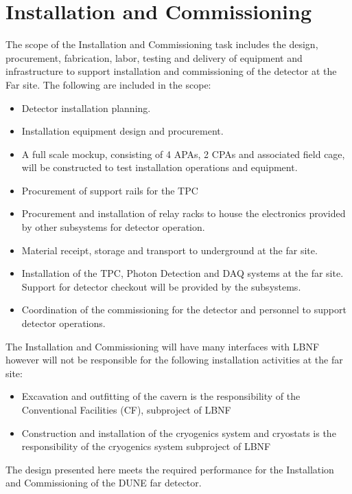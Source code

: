 \section{Installation and Commissioning}
\label{sec:detectors-fd-ref-install}

The scope of the Installation and Commissioning task includes the design, procurement, fabrication, labor, testing and delivery of equipment and infrastructure to support installation and commissioning of the detector at the Far site. The following are included in the scope:
\begin{itemize}
\item Detector installation planning.
\item Installation equipment design and procurement.
\item A full scale mockup, consisting of 4 APAs, 2 CPAs and associated field cage, will be constructed to test installation operations and equipment.
\item Procurement of support rails for the TPC
\item Procurement and installation of relay racks to house the electronics provided by other subsystems for detector operation.
\item Material receipt, storage and transport to underground at the far site.
\item Installation of the TPC, Photon Detection and DAQ systems at the far site.  Support for detector checkout will be provided by the subsystems.
\item Coordination of the commissioning for the detector and personnel to support detector operations.
\end{itemize}

The Installation and Commissioning will have many interfaces with LBNF however will not be responsible for the following installation activities at the far site:
\begin{itemize}
\item Excavation and outfitting of the cavern is the responsibility of the Conventional Facilities (CF), subproject of LBNF
\item Construction and installation of the cryogenics system and cryostats is the responsibility of the cryogenics system subproject of LBNF
\end{itemize}

The design presented here meets the required performance for the Installation and Commissioning of the DUNE far detector. 


